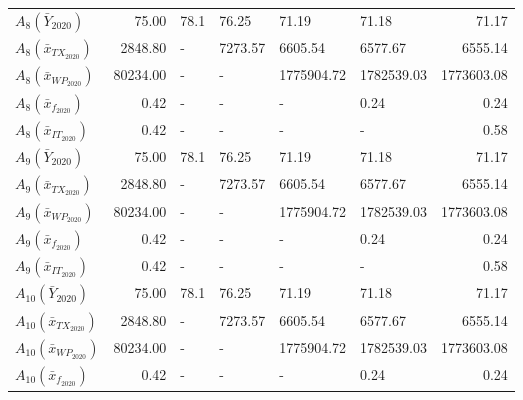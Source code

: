 \begin{tabular}{lrllllr}
      $A_{8}(\bar{Y}_{2020})$ &    75.00 &                78.1 &               76.25 &               71.19 &               71.18 &                71.17 \\
 $A_{8}(\bar{x}_{TX_{2020}})$ &  2848.80 &                   - &             7273.57 &             6605.54 &             6577.67 &              6555.14 \\
 $A_{8}(\bar{x}_{WP_{2020}})$ & 80234.00 &                   - &                   - &          1775904.72 &          1782539.03 &           1773603.08 \\
  $A_{8}(\bar{x}_{f_{2020}})$ &     0.42 &                   - &                   - &                   - &                0.24 &                 0.24 \\
 $A_{8}(\bar{x}_{IT_{2020}})$ &     0.42 &                   - &                   - &                   - &                   - &                 0.58 \\
      $A_{9}(\bar{Y}_{2020})$ &    75.00 &                78.1 &               76.25 &               71.19 &               71.18 &                71.17 \\
 $A_{9}(\bar{x}_{TX_{2020}})$ &  2848.80 &                   - &             7273.57 &             6605.54 &             6577.67 &              6555.14 \\
 $A_{9}(\bar{x}_{WP_{2020}})$ & 80234.00 &                   - &                   - &          1775904.72 &          1782539.03 &           1773603.08 \\
  $A_{9}(\bar{x}_{f_{2020}})$ &     0.42 &                   - &                   - &                   - &                0.24 &                 0.24 \\
 $A_{9}(\bar{x}_{IT_{2020}})$ &     0.42 &                   - &                   - &                   - &                   - &                 0.58 \\
     $A_{10}(\bar{Y}_{2020})$ &    75.00 &                78.1 &               76.25 &               71.19 &               71.18 &                71.17 \\
$A_{10}(\bar{x}_{TX_{2020}})$ &  2848.80 &                   - &             7273.57 &             6605.54 &             6577.67 &              6555.14 \\
$A_{10}(\bar{x}_{WP_{2020}})$ & 80234.00 &                   - &                   - &          1775904.72 &          1782539.03 &           1773603.08 \\
 $A_{10}(\bar{x}_{f_{2020}})$ &     0.42 &                   - &                   - &                   - &                0.24 &                 0.24 \\

\end{tabular}
